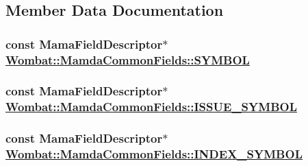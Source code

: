 \subsection{Member Data Documentation}
\hypertarget{classWombat_1_1MamdaCommonFields_52242fa6e097ae76f1f556d7843bdad3}{
\subsubsection[SYMBOL]{\setlength{\rightskip}{0pt plus 5cm}const Mama\-Field\-Descriptor$\ast$ \hyperlink{classWombat_1_1MamdaCommonFields_52242fa6e097ae76f1f556d7843bdad3}{Wombat::Mamda\-Common\-Fields::SYMBOL}}}
\label{classWombat_1_1MamdaCommonFields_52242fa6e097ae76f1f556d7843bdad3}


\hypertarget{classWombat_1_1MamdaCommonFields_99f721fdf7139674177962f0a919ba21}{
\subsubsection[ISSUE\_\-SYMBOL]{\setlength{\rightskip}{0pt plus 5cm}const Mama\-Field\-Descriptor$\ast$ \hyperlink{classWombat_1_1MamdaCommonFields_99f721fdf7139674177962f0a919ba21}{Wombat::Mamda\-Common\-Fields::ISSUE\_\-SYMBOL}}}
\label{classWombat_1_1MamdaCommonFields_99f721fdf7139674177962f0a919ba21}


\hypertarget{classWombat_1_1MamdaCommonFields_215204714b6b897dcca757cdc4e15767}{
\subsubsection[INDEX\_\-SYMBOL]{\setlength{\rightskip}{0pt plus 5cm}const Mama\-Field\-Descriptor$\ast$ \hyperlink{classWombat_1_1MamdaCommonFields_215204714b6b897dcca757cdc4e15767}{Wombat::Mamda\-Common\-Fields::INDEX\_\-SYMBOL}}}
\label{classWombat_1_1MamdaCommonFields_215204714b6b897dcca757cdc4e15767}



